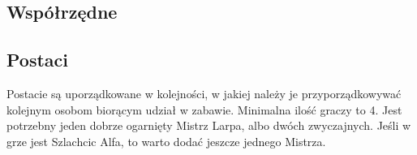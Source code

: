 	\subsection{Współrzędne}
	\label{sec:wspolrzedne}
		\begin{multicols}{3}
		\end{multicols}

	\subsection{Postaci}
	\label{sec:characters}
		Postacie są uporządkowane w kolejności, w jakiej należy je przyporządkowywać kolejnym osobom biorącym udział w zabawie.
		Minimalna ilość graczy to 4. Jest potrzebny jeden dobrze ogarnięty Mistrz Larpa, albo dwóch zwyczajnych.
		Jeśli w grze jest Szlachcic Alfa, to warto dodać jeszcze jednego Mistrza.
		
